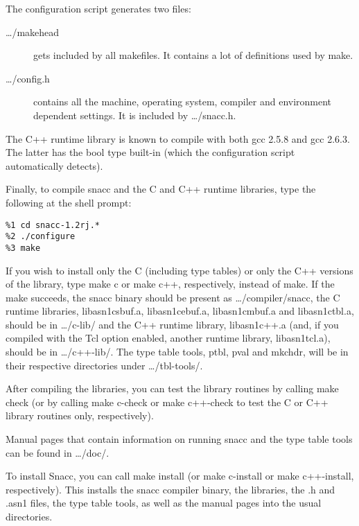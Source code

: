 The configuration script generates two files:
\begin{description}
  \item[{\ufn \dots/makehead}] gets included by all makefiles.
    It contains a lot of definitions used by make.
  \item[{\ufn \dots/config.h}] contains all the machine, operating system, compiler and environment dependent settings.
    It is included by {\ufn \dots/snacc.h}.
\end{description}

The C++ runtime library is known to compile with both {\ufn gcc 2.5.8} and {\ufn gcc 2.6.3}.
The latter has the {\C bool} type built-in (which the configuration script automatically detects).

Finally, to compile {\ufn snacc} and the C and C++ runtime libraries,
type the following at the shell prompt:

\begin{verbatim}
%1 cd snacc-1.2rj.*
%2 ./configure
%3 make
\end{verbatim}

If you wish to install only the C (including type tables) or only the
C++ versions of the library, type {\ufn make c} or {\ufn make c++},
respectively, instead of {\ufn make}.  If the make succeeds, the
{\ufn snacc} binary should be present as {\ufn \dots/compiler/snacc},
the C runtime libraries, {\ufn libasn1csbuf.a},
{\ufn libasn1cebuf.a}, {\ufn libasn1cmbuf.a} and {\ufn libasn1ctbl.a}, should be in
{\ufn \dots/c-lib/} and the C++ runtime library, {\ufn libasn1c++.a}
(and, if you compiled with the Tcl option enabled,
another runtime library, {\ufn libasn1tcl.a}),
should be in {\ufn \dots/c++-lib/}.
The type table tools,
{\ufn ptbl}, {\ufn pval} and {\ufn mkchdr}, will be in their respective directories under {\ufn \dots/tbl-tools/}.

After compiling the libraries, you can test the library routines by calling {\ufn make check}
(or by calling {\ufn make c-check} or {\ufn make c++-check} to test the C or C++ library routines only, respectively).

Manual pages that contain information on running {\ufn snacc} and the type table tools can be found in {\ufn \dots/doc/}.  

To install Snacc, you can call {\ufn make install} (or {\ufn make c-install} or {\ufn make c++-install}, respectively).
This installs the snacc compiler binary, the libraries, the {\ufn .h} and {\ufn .asn1} files, the type table tools, as well as the manual pages into the usual directories.

